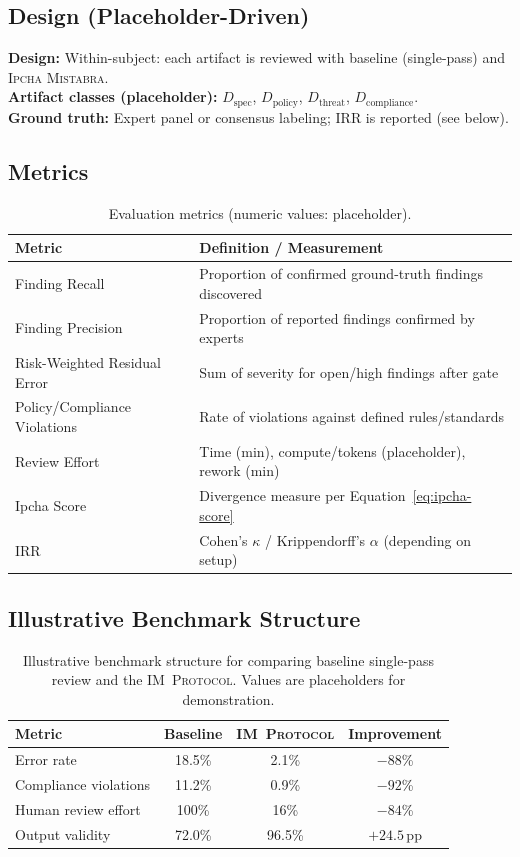 \documentclass[11pt,a4paper]{article}
\newcommand{\methodname}{\textsc{Ipcha Mistabra}}
\newcommand{\protshort}{\textsc{IM~Protocol}}
\begin{document}
\subsection{Design (Placeholder-Driven)}
\textbf{Design:} Within-subject: each artifact is reviewed with baseline (single-pass) and \methodname{}.\\
\textbf{Artifact classes (placeholder):} $D_{\text{spec}}$, $D_{\text{policy}}$, $D_{\text{threat}}$, $D_{\text{compliance}}$.\\
\textbf{Ground truth:} Expert panel or consensus labeling; IRR is reported (see below).

\subsection{Metrics}
\begin{table}[h]
\centering
\begin{tabular}{@{}ll@{}}
\toprule
Metric & Definition / Measurement \\ \midrule
Finding Recall & Proportion of confirmed ground-truth findings discovered \\
Finding Precision & Proportion of reported findings confirmed by experts \\
Risk-Weighted Residual Error & Sum of severity for open/high findings after gate \\
Policy/Compliance Violations & Rate of violations against defined rules/standards \\
Review Effort & Time (min), compute/tokens (placeholder), rework (min) \\
Ipcha Score & Divergence measure per Equation~\ref{eq:ipcha-score} \\
IRR & Cohen's $\kappa$ / Krippendorff's $\alpha$ (depending on setup) \\ \bottomrule
\end{tabular}
\caption{Evaluation metrics (numeric values: placeholder).}
\end{table}

\subsection{Illustrative Benchmark Structure}
\begin{table}[h]
\centering
\small
\begin{tabular}{lccc}
\toprule
Metric & Baseline & \protshort{} & Improvement \\
\midrule
Error rate & 18.5\% & 2.1\% & $-88$\% \\
Compliance violations & 11.2\% & 0.9\% & $-92$\% \\
Human review effort & 100\% & 16\% & $-84$\% \\
Output validity & 72.0\% & 96.5\% & $+24.5$\,pp \\
\bottomrule
\end{tabular}
\caption{Illustrative benchmark structure for comparing baseline single-pass review and the \protshort{}. Values are placeholders for demonstration.}
\label{tab:bench}
\end{table}
\end{document}
